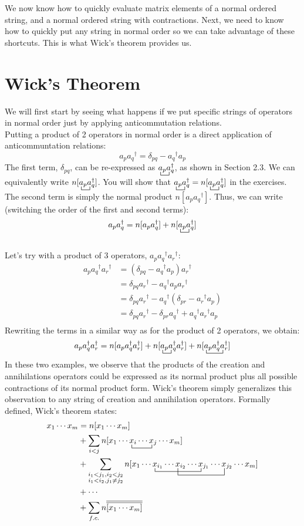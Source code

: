 \documentclass{article}
\newcommand{\ol}{\overline}
\newcommand{\ctr}{\bcontraction}
\newcommand{\dg}{\ensuremath{^\dagger} }
\newcommand{\cd}{\ensuremath{\cdots} }
\begin{document}
We now know how to quickly evaluate matrix elements of a normal ordered string, and a normal ordered string with contractions.
Next, we need to know how to quickly put any string in normal order so we can take advantage of these shortcuts. 
This is what Wick's theorem provides us. 

\section{Wick's Theorem}
We will first start by seeing what happens if we put specific strings of operators in normal order just by applying anticommutation relations.  \\ 
Putting a product of 2 operators in normal order is a direct application of anticommuntation relations: 
\[a_p a_q\dg = \delta_{pq} - a_q\dg a_p \]
The first term, $\delta_{pq}$, can be re-expressed as $\ctr{}{a}{{}_p}{a}a_p a_q\dg$, as shown in Section 2.3. 
We can equivalently write $n[\ctr{}{a}{{}_p}{a}a_p a_q\dg]$.
You will show that $\ctr{}{a}{{}_p}{a}a_p a_q\dg = n[\ctr{}{a}{{}_p}{a}a_p a_q\dg]$ in the exercises. 
The second term is simply the normal product $n[a_p a_q\dg]$. 
Thus, we can write (switching the order of the first and second terms): 
\[a_p a_q\dg = n[a_p a_q\dg] + n[\ctr{}{a}{{}_p}{a}a_p a_q\dg] \]
\\
Let's try with a product of 3 operators, $a_p a_q\dg a_r\dg$: 
\begin{align*}
a_p a_q\dg a_r\dg &= (\delta_{pq} - a_q\dg a_p)a_r\dg \\
&= \delta_{pq}a_r\dg  - a_q\dg a_p a_r\dg \\
& = \delta_{pq}a_r\dg - a_q\dg (\delta_{pr} - a_r\dg a_p)  \\
& = \delta_{pq}a_r\dg - \delta_{pr} a_q\dg +  a_q\dg a_r\dg a_p  \\
\end{align*}
Rewriting the terms in a similar way as for the product of 2 operators, we obtain:
\[a_p a_q\dg a_r\dg  = n[a_p a_q\dg a_r\dg ] + n[\ctr{}{a}{{}_p}{a} a_p a_q\dg a_r\dg ]  + n[\ctr{}{a}{{}_p a_q\dg}{a} a_p a_q\dg a_r\dg ] \]
In these two examples, we observe that the products of the creation and annihilations operators could be expressed as its normal product plus all possible contractions of its normal product form.
Wick's theorem simply generalizes this observation to any string of creation and annihilation operators. 
Formally defined, Wick's theorem states: 
\begin{align*}
x_1 \cd x_m &= n[x_1 \cd x_m ]  \\
&+ \sum_{i < j} \ctr{n[x_1 \cd}{x}{{}_i \cd }{x} n[x_1 \cd x_i \cd x_j\cd  x_m] \\
&+ \sum_{\substack{i_1 < j_1,  i_2 < j_2 \\ i_1 < i_2, j_1 \neq j_2}} 
\ctr{n[x_1 \cd}{x}{{}_{i_1} \cd x_{i_2} \cd}{x}
\ctr[2ex]{n[x_1 \cd x_{i_1} \cd }{x}{{}_{i_2} \cd x_{j_1} \cd}{x}
n[x_1 \cd x_{i_1} \cd x_{i_2} \cd x_{j_1} \cd x_{j_2} \cd x_m ]  \\
&+ \cd \\
&+ \sum_{f.c.} n \ol{\ol{[x_1 \cd x_m]  }}
\end{align*}
\end{document}
